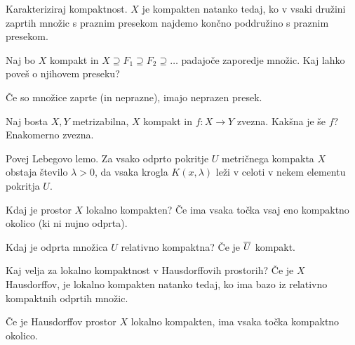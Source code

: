 \begin{vo}{Karakteriziraj kompaktnost.}
  $X$ je kompakten natanko tedaj, ko v vsaki družini zaprtih množic s praznim presekom
  najdemo končno poddružino s praznim presekom.
\end{vo}

\begin{vo}{Naj bo $X$ kompakt in $X \supseteq F_1 \supseteq F_2 \supseteq \ldots$ padajoče zaporedje množic.
	Kaj lahko poveš o njihovem preseku?}

  Če so množice zaprte (in neprazne), imajo neprazen presek.
\end{vo}

\begin{vo}{Naj bosta $X, Y$ metrizabilna, $X$ kompakt in $f : X \to Y$ zvezna. Kakšna je še $f$?}
  Enakomerno zvezna.
\end{vo}

\begin{vo}{Povej Lebegovo lemo.}
  Za vsako odprto pokritje $U$ metričnega kompakta $X$ obstaja število $\lambda > 0$, da
  vsaka krogla $K(x, \lambda)$ leži v celoti v nekem elementu pokritja $U$.
\end{vo}

\begin{vo}{Kdaj je prostor $X$ lokalno kompakten?}
  Če ima vsaka točka vsaj eno kompaktno okolico (ki ni nujno odprta).
\end{vo}

\begin{vo}{Kdaj je odprta množica $U$ relativno kompaktna?}
  Če je $\overline{U}$ kompakt.
\end{vo}

\begin{vo}{Kaj velja za lokalno kompaktnost v Hausdorffovih prostorih?}
  Če je $X$ Hausdorffov, je lokalno kompakten natanko tedaj, ko ima bazo
  iz relativno kompaktnih odprtih množic.

  Če je Hausdorffov prostor $X$ lokalno kompakten, ima vsaka točka kompaktno okolico.
\end{vo}
